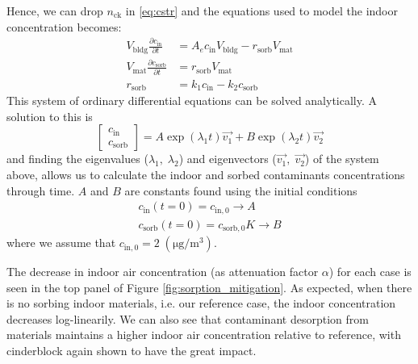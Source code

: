 Hence, we can drop $n_\mathrm{ck}$ in \eqref{eq:cstr} and the equations used to model the indoor concentration becomes:
\begin{align}
  V_\mathrm{bldg} \frac{\partial c_\mathrm{in}}{\partial t} &= A_e c_\mathrm{in} V_\mathrm{bldg} - r_\mathrm{sorb} V_\mathrm{mat}\label{eq:cstr} \\
  V_\mathrm{mat} \frac{\partial c_\mathrm{sorb}}{\partial t} &= r_\mathrm{sorb} V_\mathrm{mat}\label{eq:sorbed_concentration} \\
  r_\mathrm{sorb} &= k_1 c_\mathrm{in} - k_2 c_\mathrm{sorb}\label{eq:sorption_rate}
\end{align}
This system of ordinary differential equations can be solved analytically.
A solution to this is
\begin{equation}
  \begin{bmatrix}
    c_\mathrm{in} \\ c_\mathrm{sorb}
  \end{bmatrix} =
  A \exp{(\lambda_1 t)} \vec{v_1} + B \exp{(\lambda_2 t)} \vec{v_2}
\end{equation}
and finding the eigenvalues ($\lambda_1, \; \lambda_2$) and eigenvectors ($\vec{v_1}, \; \vec{v_2}$) of the system above, allows us to calculate the indoor and sorbed contaminants concentrations through time.
$A$ and $B$ are constants found using the initial conditions
\begin{align}
  c_\mathrm{in}(t=0) = c_\mathrm{in,0} \rightarrow A \\
  c_\mathrm{sorb}(t=0) = c_\mathrm{sorb,0} K \rightarrow B
\end{align}
where we assume that $c_\mathrm{in,0} = 2 \; \mathrm{(\mu g/m^3)}$.\par

The decrease in indoor air concentration (as attenuation factor $\alpha$) for each case is seen in the top panel of Figure \ref{fig:sorption_mitigation}.
As expected, when there is no sorbing indoor materials, i.e. our reference case, the indoor concentration decreases log-linearily.
We can also see that contaminant desorption from materials maintains a higher indoor air concentration relative to reference, with cinderblock again shown to have the great impact.\par

